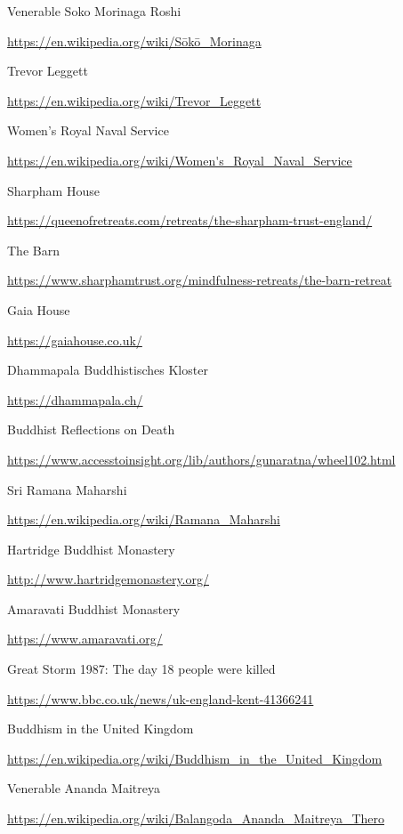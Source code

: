 \begin{thebibliography}{9}
 Venerable Soko Morinaga Roshi

  {\urlsize \url{https://en.wikipedia.org/wiki/Sōkō_Morinaga}}

 Trevor Leggett

  {\urlsize \url{https://en.wikipedia.org/wiki/Trevor_Leggett}}

 Women's Royal Naval Service

  {\urlsize \url{https://en.wikipedia.org/wiki/Women's_Royal_Naval_Service}}

 Sharpham House

  {\urlsize \url{https://queenofretreats.com/retreats/the-sharpham-trust-england/}}

 The Barn

  {\urlsize \url{https://www.sharphamtrust.org/mindfulness-retreats/the-barn-retreat}}

 Gaia House

  {\urlsize \url{https://gaiahouse.co.uk/}}

 Dhammapala Buddhistisches Kloster

  {\urlsize \url{https://dhammapala.ch/}}

 Buddhist Reflections on Death

  {\urlsize \url{https://www.accesstoinsight.org/lib/authors/gunaratna/wheel102.html}}

 Sri Ramana Maharshi

  {\urlsize \url{https://en.wikipedia.org/wiki/Ramana_Maharshi}}

 Hartridge Buddhist Monastery

  {\urlsize \url{http://www.hartridgemonastery.org/}}

 Amaravati Buddhist Monastery

  {\urlsize \url{https://www.amaravati.org/}}

 Great Storm 1987: The day 18 people were killed

  {\urlsize \url{https://www.bbc.co.uk/news/uk-england-kent-41366241}}

 Buddhism in the United Kingdom

  {\urlsize \url{https://en.wikipedia.org/wiki/Buddhism_in_the_United_Kingdom}}

 Venerable Ananda Maitreya

  {\urlsize \url{https://en.wikipedia.org/wiki/Balangoda_Ananda_Maitreya_Thero}}


\end{thebibliography}
